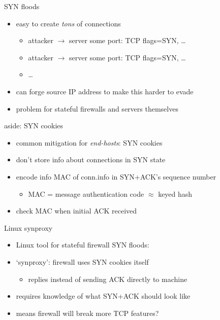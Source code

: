 \begin{frame}{SYN floods}
    \begin{itemize}
    \item easy to create \textit{tons} of connections
        \begin{itemize}
        \item attacker $\rightarrow$ server some port: TCP flags=SYN, \ldots
        \item attacker $\rightarrow$ server some port: TCP flags=SYN, \ldots
        \item \ldots
        \end{itemize}
    \item can forge source IP address to make this harder to evade
    \vspace{.5cm}
    \item problem for stateful firewalls and servers themselves
    \end{itemize}
\end{frame}

\begin{frame}{aside: SYN cookies}
    \begin{itemize}
    \item common mitigation for \textit{end-hosts}: SYN cookies
    \item don't store info about connections in SYN state
    \item encode info MAC of conn.info in SYN+ACK's sequence number
        \begin{itemize}
        \item MAC = message authentication code $\approx$ keyed hash
        \end{itemize}
    \item check MAC when initial ACK received
    \end{itemize}
\end{frame}


\begin{frame}{Linux synproxy}
    \begin{itemize}
    \item Linux tool for stateful firewall SYN floods:
    \item `synproxy': firewall uses SYN cookies itself
        \begin{itemize}
        \item replies instead of sending ACK directly to machine
        \end{itemize}
    \item requires knowledge of what SYN+ACK should look like
    \item means firewall will break more TCP features?
    \end{itemize}
\end{frame}


